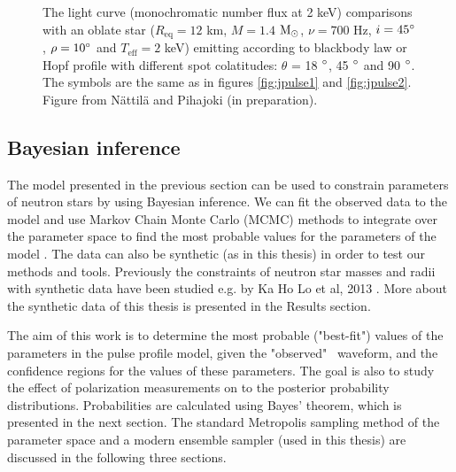 \documentclass{wihuri}
\def\msun{{\rm M_{\odot}}}
\begin{document}
\begin{figure}
\centerline{}
\caption{The light curve (monochromatic number flux at 2 keV) comparisons with an oblate star ($R_{\mathrm{eq}} = 12$ km, $M = 1.4$ $\msun$, $\nu = 700$ Hz, $i = 45 \degree$, $\rho = 10 \degree$ and $T_{\mathrm{eff}} = 2$ keV) emitting according to blackbody law or Hopf profile with different spot colatitudes: $\theta$ = 18 $\degree$, 45 $\degree$ and 90 $\degree$. The symbols are the same as in figures \ref{fig:jpulse1} and \ref{fig:jpulse2}. Figure from Nättilä and Pihajoki (in preparation).
\label{fig:jpulse3}}
\end{figure}




\subsection{Bayesian inference}



The model presented in the previous section can be used to constrain parameters of neutron stars by using Bayesian inference. We can fit the observed data to the model and use Markov Chain Monte Carlo (MCMC) methods to integrate over the parameter space to find the most probable values for the parameters of the model \cite{mc_methods_book}. The data can also be synthetic (as in this thesis) in order to test our methods and tools. %
Previously the constraints of neutron star masses and radii with synthetic data have been studied e.g. by Ka Ho Lo et al, 2013 \cite{miller}. %
More about the synthetic data of this thesis is presented in the Results section. 

The aim of this work is to determine the most probable ("best-fit") values of the parameters in the pulse profile model, given the "observed" \ 
waveform, and the confidence regions for the values of these parameters. The goal is also to study the effect of polarization measurements on to the posterior probability distributions. Probabilities are calculated using Bayes' theorem, which is presented in the next section. The standard Metropolis sampling method of the parameter space and a modern ensemble sampler (used in this thesis) are discussed in the following three sections. 
\end{document}
